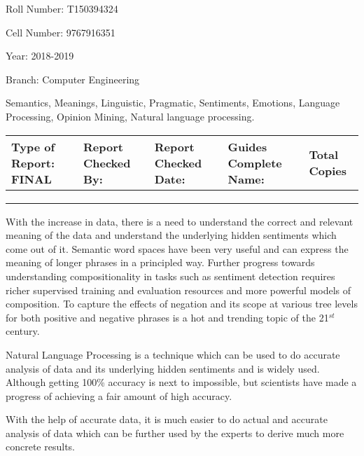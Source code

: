 \documentclass{article} %
\begin{document}
\noindent Roll Number: T150394324

\noindent Cell Number: 9767916351

\noindent Year: 2018-2019

\noindent Branch: Computer Engineering

\noindent \textbf{\textit{}} Semantics, Meanings, Linguistic, Pragmatic, Sentiments, Emotions, Language Processing, Opinion Mining, Natural language processing.

\noindent \textbf{\textit{\underbar{}}}

\begin{tabular}{|p{0.9in}|p{0.7in}|p{0.9in}|p{1.0in}|p{1.2in}|} \hline 
Type of \newline Report: FINAL  & Report Checked By:  & Report \newline Checked Date:  & Guides Complete \newline Name:   & Total Copies  \\ \hline 
 & \textit{} &  & \textbf{} &  \\ \hline 
 &  &  & \textbf{} &  \\ \hline 
 & \textit{} &  & \textbf{} &  \\ \hline 
\end{tabular}

\textbf{\textit{}}

With the increase in data, there is a need to understand the correct and relevant meaning of the data and understand the underlying hidden sentiments which come out of it. Semantic word spaces have been very useful and can express the meaning of longer phrases in a principled way. Further progress towards understanding compositionality in tasks such as sentiment detection requires richer supervised training and evaluation resources and more powerful models of composition. To capture the effects of negation and its scope at various tree levels for both positive and negative phrases is a hot and trending topic of the 21${}^{st}$ century. 

Natural Language Processing is a technique which can be used to do accurate analysis of data and its underlying hidden sentiments and is widely used. Although getting 100\% accuracy is next to impossible, but scientists have made a progress of achieving a fair amount of high accuracy. 

With the help of accurate data, it is much easier to do actual and accurate analysis of data which can be further used by the experts to derive much more concrete results. 
\end{document}
